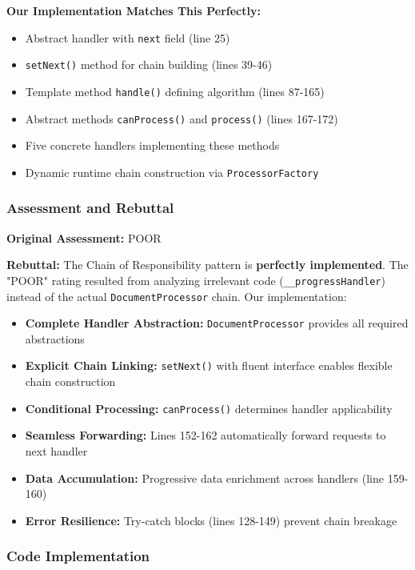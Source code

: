 \documentclass[11pt]{article}
\begin{document}
\textbf{Our Implementation Matches This Perfectly:}
\begin{itemize}[noitemsep]
    \item [+] Abstract handler with \texttt{next} field (line 25)
    \item [+] \texttt{setNext()} method for chain building (lines 39-46)
    \item [+] Template method \texttt{handle()} defining algorithm (lines 87-165)
    \item [+] Abstract methods \texttt{canProcess()} and \texttt{process()} (lines 167-172)
    \item [+] Five concrete handlers implementing these methods
    \item [+] Dynamic runtime chain construction via \texttt{ProcessorFactory}
\end{itemize}

\subsubsection{Assessment and Rebuttal}
\textbf{Original Assessment:} POOR

\textbf{Rebuttal:} The Chain of Responsibility pattern is \textbf{perfectly implemented}. The "POOR" rating resulted from analyzing irrelevant code (\texttt{\_\_progressHandler}) instead of the actual \texttt{DocumentProcessor} chain. Our implementation:

\begin{itemize}[noitemsep]
    \item \textbf{Complete Handler Abstraction:} \texttt{DocumentProcessor} provides all required abstractions
    \item \textbf{Explicit Chain Linking:} \texttt{setNext()} with fluent interface enables flexible chain construction
    \item \textbf{Conditional Processing:} \texttt{canProcess()} determines handler applicability
    \item \textbf{Seamless Forwarding:} Lines 152-162 automatically forward requests to next handler
    \item \textbf{Data Accumulation:} Progressive data enrichment across handlers (line 159-160)
    \item \textbf{Error Resilience:} Try-catch blocks (lines 128-149) prevent chain breakage
\end{itemize}

\subsubsection{Code Implementation}
\end{document}

